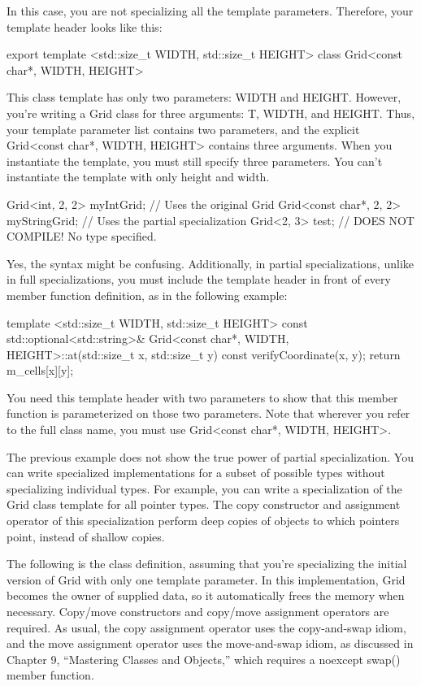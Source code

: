 In this case, you are not specializing all the template parameters. Therefore, your template header looks like this:

\begin{cpp}
export template <std::size_t WIDTH, std::size_t HEIGHT>
class Grid<const char*, WIDTH, HEIGHT>
\end{cpp}

This class template has only two parameters: WIDTH and HEIGHT. However, you’re writing a Grid class for three arguments: T, WIDTH, and HEIGHT. Thus, your template parameter list contains two parameters, and the explicit Grid<const char*, WIDTH, HEIGHT> contains three arguments. When you instantiate the template, you must still specify three parameters. You can’t instantiate the template with only height and width.

\begin{cpp}
Grid<int, 2, 2> myIntGrid; // Uses the original Grid
Grid<const char*, 2, 2> myStringGrid; // Uses the partial specialization
Grid<2, 3> test; // DOES NOT COMPILE! No type specified.
\end{cpp}

Yes, the syntax might be confusing. Additionally, in partial specializations, unlike in full specializations, you must include the template header in front of every member function definition, as in the following example:

\begin{cpp}
template <std::size_t WIDTH, std::size_t HEIGHT>
const std::optional<std::string>&
    Grid<const char*, WIDTH, HEIGHT>::at(std::size_t x, std::size_t y) const
{
    verifyCoordinate(x, y);
    return m_cells[x][y];
}
\end{cpp}

You need this template header with two parameters to show that this member function is parameterized on those two parameters. Note that wherever you refer to the full class name, you must use Grid<const char*, WIDTH, HEIGHT>.

The previous example does not show the true power of partial specialization. You can write specialized implementations for a subset of possible types without specializing individual types. For example, you can write a specialization of the Grid class template for all pointer types. The copy constructor and assignment operator of this specialization perform deep copies of objects to which pointers point, instead of shallow copies.

The following is the class definition, assuming that you’re specializing the initial version of Grid with only one template parameter. In this implementation, Grid becomes the owner of supplied data, so it automatically frees the memory when necessary. Copy/move constructors and copy/move assignment operators are required. As usual, the copy assignment operator uses the copy-and-swap idiom, and the move assignment operator uses the move-and-swap idiom, as discussed in Chapter 9, “Mastering Classes and Objects,” which requires a noexcept swap() member function.


